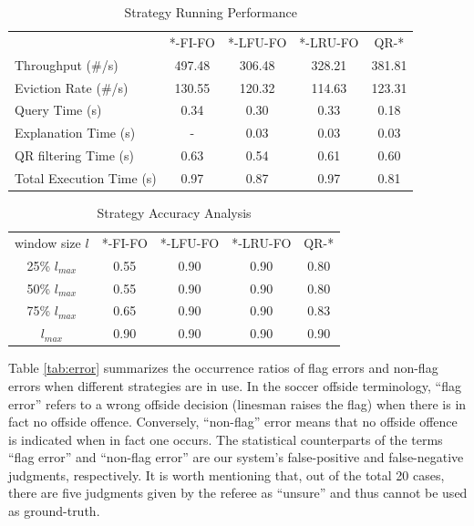 \begin{table}[!htbp]
\centering
\caption{Strategy Running Performance}
\label{tb:rp}
\begin{tabular}{|l||c|c|c|c|}
\hline
 & *-FI-FO & *-LFU-FO & *-LRU-FO & QR-* \\ \hhline{|=#=|=|=|=|}
Throughput (\#/s) & 497.48 & 306.48 & 328.21 & 381.81 \\ \hline
Eviction Rate (\#/s) & 130.55 & 120.32 & 114.63 & 123.31 \\ \hline
Query Time (s) & 0.34 & 0.30 & 0.33 & 0.18 \\ \hline
Explanation Time (s) & - & 0.03 & 0.03 & 0.03 \\ \hline
QR filtering Time (s) & 0.63 & 0.54 & 0.61 & 0.60 \\ \hhline{|=#=|=|=|=|}
Total Execution Time (s) & 0.97 & 0.87 & 0.97 & 0.81 \\ \hline
\end{tabular}
\end{table}

\begin{table}[!htbp]
\centering
\caption{Strategy Accuracy Analysis}
\label{tb:accuracy}
\begin{tabular}{|c||c|c|c|c|}
\hline
window size $l$ & *-FI-FO & *-LFU-FO & *-LRU-FO & QR-* \\ \hhline{|=#=|=|=|=|}
25\% $l_{max}$ & 0.55 & 0.90 & 0.90 & 0.80 \\ \hline
50\% $l_{max}$ & 0.55 & 0.90 & 0.90 & 0.80 \\ \hline
75\% $l_{max}$ & 0.65 & 0.90 & 0.90 & 0.83 \\ \hline
$l_{max}$ & 0.90 & 0.90 & 0.90 & 0.90 \\ \hline
\end{tabular}
\end{table}

Table \ref{tab:error} summarizes the occurrence ratios of flag errors and non-flag errors when different strategies are in use. 
In the soccer offside terminology, ``flag error'' refers to a wrong offside decision (linesman raises the flag) when there is in fact no offside offence.
Conversely, ``non-flag'' error means that no offside offence is indicated when in fact one occurs. 
The statistical counterparts of the terms ``flag error'' and ``non-flag error'' are our system's false-positive and false-negative judgments, respectively. 
It is worth mentioning that, out of the total 20 cases, there are five judgments given by the referee as ``unsure'' and thus cannot be used as ground-truth. 

